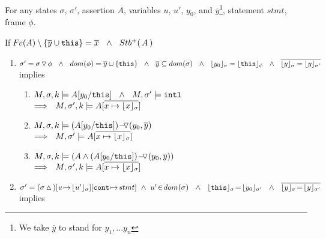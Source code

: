 \begin{lemma}
\label{l:calls}
For any states $\sigma$, $\sigma'$, assertion $A$, %
variables  $u$, $u'$, $y_0$, and  $\overline{y}$\footnote{We take $\overline y$ to stand for $y_1, ... y_n$}, statement $stmt$, frame $\phi$.

$ ~ $ %
\\
If 
 $\fv(A)\setminus\{ {\overline{y}} \cup \prg{this} \} =\overline{x}\ \ \wedge \ \  \Pos A$
  
\begin{enumerate}

\item
\label{l:calls:callee}
$\sigma'=\sigma  \pushSymbol \phi \ \ \wedge \ \  dom(\phi)=\overline{y}\cup \{ \prg{this} \}\ \ \wedge\ \ 
\overline{y} \subseteq dom(\sigma)\ \  \wedge\ \
\interpret \sigma {y_0} = \interpret \phi {\prg{this}}\ \ \wedge \ \ 
\overline{ {\interpret \sigma y}= {\interpret {\sigma'} y}}$\\
implies

\begin{enumerate}
\item
\label{l:calls:callee:one}
$\satDAssertFrom M  \sigma k   A[y_0/\prg{this}] \ \    \wedge\ \ M, \sigma' \models \intThis 
$\\
$\Longrightarrow\ \  \satDAssertFrom M  {\sigma'} k   A[\overline {x \mapsto {\interpret \sigma x}}]$

\item
\label{l:calls:callee:two}
$\satDAssertFrom M  \sigma k   {\PushASLong  {(y_0,\overline{y})} {( A[y_0/\prg{this}])}}$\\  
$\Longrightarrow\ \  M,  {\sigma'} \models   A[\overline {x \mapsto {\interpret \sigma x}}]$

\item
\label{l:calls:callee:three}
$\satDAssertFrom M  \sigma k   {(A \wedge \PushASLong  {(y_0,\overline{y})} {( A[y_0/\prg{this}])})}$\\  
$\Longrightarrow\ \  \satDAssertFrom M  {\sigma'} k   A[\overline {x \mapsto {\interpret \sigma x}}]$


\end{enumerate}
\item
\label{l:calls:caller}
$\sigma'= (\sigma \popSymbol)[u\! \mapsto\! {\interpret {\sigma} {u'}}][\prg{cont}\!\mapsto\! stmt]\ \wedge \ u'\! \in\! dom(\sigma)\ \  \wedge\ \  
 \interpret \sigma {\prg{this}}\! =\! \interpret {\sigma'} {y_0} \ \ \wedge \ \ 
\overline{ {\interpret {\sigma} y}\!=\! {\interpret {\sigma'} y}}$\\
implies


\end{enumerate}
\end{lemma}
